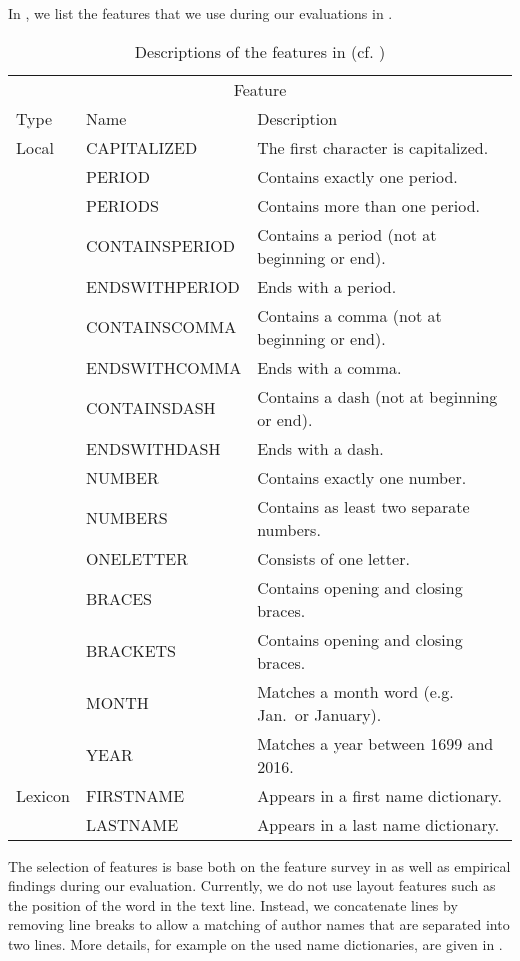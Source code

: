 In , we list the features that we use during our evaluations in .
\begin{table}[t]
\centering
\begin{tabular}{l l l}
  \toprule
  \multicolumn{3}{c}{Feature}\\
  Type    & Name            & Description\\
  \midrule
  Local   & CAPITALIZED     & The first character is capitalized.\\
          & PERIOD          & Contains exactly one period.\\
          & PERIODS         & Contains more than one period.\\
          & CONTAINSPERIOD  & Contains a period (not at beginning or end).\\
          & ENDSWITHPERIOD  & Ends with a period.\\
          & CONTAINSCOMMA   & Contains a comma (not at beginning or end).\\
          & ENDSWITHCOMMA   & Ends with a comma.\\
          & CONTAINSDASH    & Contains a dash (not at beginning or end).\\
          & ENDSWITHDASH    & Ends with a dash.\\
          & NUMBER          & Contains exactly one number.\\
          & NUMBERS         & Contains as least two separate numbers.\\
          & ONELETTER       & Consists of one letter.\\
          & BRACES          & Contains opening and closing braces.\\
          & BRACKETS        & Contains opening and closing braces.\\
          & MONTH           & Matches a month word (e.g. Jan.\ or January).\\
          & YEAR            & Matches a year between 1699 and 2016.\\
  \midrule
  Lexicon & FIRSTNAME     & Appears in a first name dictionary.\\
          & LASTNAME      & Appears in a last name dictionary.\\
  \bottomrule
\end{tabular}
\caption{Descriptions of the features in  (cf. \citep{peng2004accurate,councill2008parscit,wu2014citeseerx,bellare2007learning})}
\label{tab:our-features}
\end{table}
The selection of features is base both on the feature survey in  as well as empirical findings during our evaluation.
Currently, we do not use layout features such as the position of the word in the text line.
Instead, we concatenate lines by removing line breaks to allow a matching of author names that are separated into two lines.
More details, for example on the used name dictionaries, are given in .

